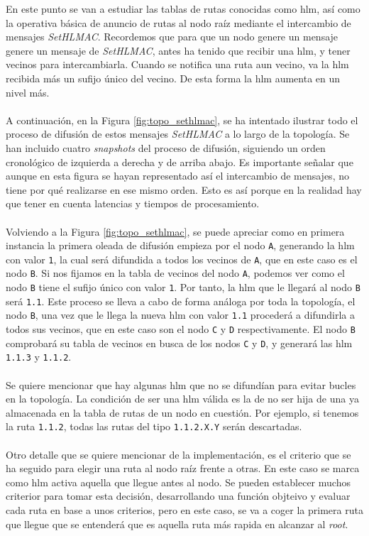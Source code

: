 En este punto se van a estudiar las tablas de rutas conocidas como \gls{hlm}, así como la operativa básica de anuncio de rutas al nodo raíz mediante el intercambio de mensajes \textit{SetHLMAC}. Recordemos que para que un nodo genere un mensaje genere un mensaje de \textit{SetHLMAC}, antes ha tenido que recibir una \gls{hlm}, y tener vecinos para intercambiarla. Cuando se notifica una ruta aun vecino, va la \gls{hlm} recibida más un sufijo único del vecino. De esta forma la \gls{hlm} aumenta en un nivel más.\\
\\
A continuación, en la Figura \ref{fig:topo_sethlmac}, se ha intentado ilustrar todo el proceso de difusión de estos mensajes \textit{SetHLMAC} a lo largo de la topología. Se han incluido cuatro \textit{snapshots} del proceso de difusión, siguiendo un orden cronológico de izquierda a derecha y de arriba abajo. Es importante señalar que aunque en esta figura se hayan representado así el intercambio de mensajes, no tiene por qué realizarse en ese mismo orden. Esto es así porque en la realidad hay que tener en cuenta latencias y tiempos de procesamiento.\\
\\
Volviendo a la Figura \ref{fig:topo_sethlmac}, se puede apreciar como en primera instancia la primera oleada de difusión empieza por el nodo \texttt{A}, generando la \gls{hlm} con valor \texttt{1}, la cual será difundida a todos los vecinos de \texttt{A}, que en este caso es el nodo \texttt{B}. Si nos fijamos en la tabla de vecinos del nodo \texttt{A}, podemos ver como el nodo \texttt{B} tiene el sufijo único con valor \texttt{1}. Por tanto, la \gls{hlm} que le llegará al nodo \texttt{B} será \texttt{1.1}. Este proceso se lleva a cabo de forma análoga por toda la topología, el nodo \texttt{B}, una vez que le llega la nueva \gls{hlm} con valor \texttt{1.1} procederá a difundirla a todos sus vecinos, que en este caso son el nodo \texttt{C} y \texttt{D} respectivamente. El nodo \texttt{B} comprobará su tabla de vecinos en busca de los  nodos \texttt{C} y \texttt{D}, y generará las \gls{hlm} \texttt{1.1.3} y \texttt{1.1.2}.\\
\\
Se quiere mencionar que hay algunas \gls{hlm} que no se difundían para evitar bucles en la topología.  La condición de ser una \gls{hlm} válida es la de no ser hija de una ya almacenada en la tabla de rutas de un nodo en cuestión. Por ejemplo, si tenemos la ruta \texttt{1.1.2}, todas las rutas del tipo \texttt{1.1.2.X.Y} serán descartadas.\\
\\
Otro detalle que se quiere mencionar de la implementación, es el criterio que se ha seguido para elegir una ruta al nodo raíz frente a otras. En este caso se marca como \gls{hlm} activa aquella que llegue antes al nodo. Se pueden establecer muchos criterior para tomar esta decisión, desarrollando una función objteivo y evaluar cada ruta en base a unos criterios, pero en este caso, se va a coger la primera ruta que llegue que se entenderá que es aquella ruta más rapida en alcanzar al \textit{root}.

